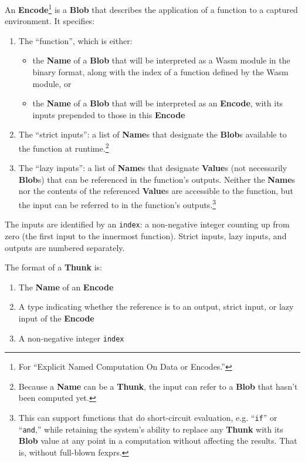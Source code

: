 \documentclass{article}
\newcommand{\blob}{\textbf{Blob}\xspace}
\newcommand{\blobs}{\textbf{Blob}s\xspace}
\newcommand{\valuexs}{\textbf{Value}s\xspace}
\newcommand{\encode}{\textbf{Encode}\xspace}
\newcommand{\thunk}{\textbf{Thunk}\xspace}
\newcommand{\name}{\textbf{Name}\xspace}
\newcommand{\names}{\textbf{Name}s\xspace}
\begin{document}
An \encode\footnote{For ``Explicit Named Computation On Data or
  Encodes.''} is a \blob that describes the application of a function
to a captured environment. It specifies:
\begin{enumerate}[topsep=0pt]

\item The ``function'', which is either:
\begin{itemize}[topsep=0pt]
\item the \name of a \blob that will be interpreted as a Wasm module in the binary format, along with the index of a function defined by the Wasm module, or
\item the \name of a \blob that will be interpreted as an \encode, with its inputs prepended to those in this \encode
\end{itemize}

\item The ``strict inputs'': a list of \names that designate the
  \blobs available to the function at runtime.\footnote{Because a
    \name can be a \thunk, the input can refer to a \blob that hasn't been computed yet.}
  
\item The ``lazy inputs'': a list of \names that designate \valuexs
  (not necessarily \blobs) that can be referenced in the function's
  outputs. Neither the \names nor the contents of the referenced
  \valuexs are accessible to the function, but the input can be
  referred to in the function's outputs.\footnote{This can support
    functions that do short-circuit evaluation, e.g. ``\texttt{if}''
    or ``\texttt{and},'' while retaining the system's ability to
    replace any \thunk with its \blob value at any point in a
    computation without affecting the results. That is, without
    full-blown fexprs.}

\end{enumerate}
  
The inputs are identified by an \texttt{index}: a non-negative integer
counting up from zero (the first input to the innermost
function). Strict inputs, lazy inputs, and outputs are numbered
separately.

\newpage
The format of a \thunk is:
\begin{enumerate}[topsep=0pt]
\item The \name of an \encode
\item A type indicating whether the reference is to an output, strict input, or lazy input of the \encode
\item A non-negative integer \texttt{index}
  \end{enumerate}
\end{document}
